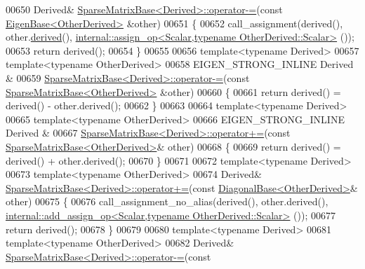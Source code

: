 \begin{DoxyCode}
00650 Derived& \hyperlink{group___sparse_core___module_class_eigen_1_1_sparse_matrix_base}{SparseMatrixBase<Derived>::operator-=}(\textcolor{keyword}{const} 
      \hyperlink{group___core___module_struct_eigen_1_1_eigen_base}{EigenBase<OtherDerived>} &other)
00651 \{
00652   call\_assignment(derived(), other.\hyperlink{group___core___module_a324b16961a11d2ecfd2d1b7dd7946545}{derived}(), 
      \hyperlink{struct_eigen_1_1internal_1_1assign__op}{internal::assign\_op<Scalar,typename OtherDerived::Scalar>}
      ());
00653   \textcolor{keywordflow}{return} derived();
00654 \}
00655 
00656 \textcolor{keyword}{template}<\textcolor{keyword}{typename} Derived>
00657 \textcolor{keyword}{template}<\textcolor{keyword}{typename} OtherDerived>
00658 EIGEN\_STRONG\_INLINE Derived &
00659 \hyperlink{group___sparse_core___module_class_eigen_1_1_sparse_matrix_base}{SparseMatrixBase<Derived>::operator-=}(\textcolor{keyword}{const} 
      \hyperlink{group___sparse_core___module_class_eigen_1_1_sparse_matrix_base}{SparseMatrixBase<OtherDerived>} &other)
00660 \{
00661   \textcolor{keywordflow}{return} derived() = derived() - other.derived();
00662 \}
00663 
00664 \textcolor{keyword}{template}<\textcolor{keyword}{typename} Derived>
00665 \textcolor{keyword}{template}<\textcolor{keyword}{typename} OtherDerived>
00666 EIGEN\_STRONG\_INLINE Derived &
00667 \hyperlink{group___sparse_core___module_class_eigen_1_1_sparse_matrix_base}{SparseMatrixBase<Derived>::operator+=}(\textcolor{keyword}{const} 
      \hyperlink{group___sparse_core___module_class_eigen_1_1_sparse_matrix_base}{SparseMatrixBase<OtherDerived>}& other)
00668 \{
00669   \textcolor{keywordflow}{return} derived() = derived() + other.derived();
00670 \}
00671 
00672 \textcolor{keyword}{template}<\textcolor{keyword}{typename} Derived>
00673 \textcolor{keyword}{template}<\textcolor{keyword}{typename} OtherDerived>
00674 Derived& \hyperlink{group___sparse_core___module_class_eigen_1_1_sparse_matrix_base}{SparseMatrixBase<Derived>::operator+=}(\textcolor{keyword}{const} 
      \hyperlink{class_eigen_1_1_diagonal_base}{DiagonalBase<OtherDerived>}& other)
00675 \{
00676   call\_assignment\_no\_alias(derived(), other.derived(), 
      \hyperlink{struct_eigen_1_1internal_1_1add__assign__op}{internal::add\_assign\_op<Scalar,typename OtherDerived::Scalar>}
      ());
00677   \textcolor{keywordflow}{return} derived();
00678 \}
00679 
00680 \textcolor{keyword}{template}<\textcolor{keyword}{typename} Derived>
00681 \textcolor{keyword}{template}<\textcolor{keyword}{typename} OtherDerived>
00682 Derived& \hyperlink{group___sparse_core___module_class_eigen_1_1_sparse_matrix_base}{SparseMatrixBase<Derived>::operator-=}(\textcolor{keyword}{const} 

\end{DoxyCode}
